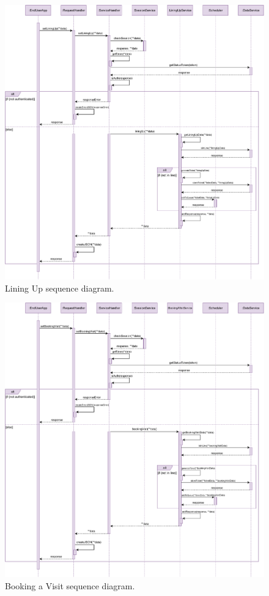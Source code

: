 \begin{figure}[H]
	\centering
	\includegraphics[width=1.0\textwidth]{images/liningUp_sequence_diagram.pdf}
	\caption{Lining Up sequence diagram.}
\end{figure}

\begin{figure}[H]
	\centering
	\includegraphics[width=1.0\textwidth]{images/bookingVisit_sequence_diagram.pdf}
	\caption{Booking a Visit sequence diagram.}
\end{figure}

